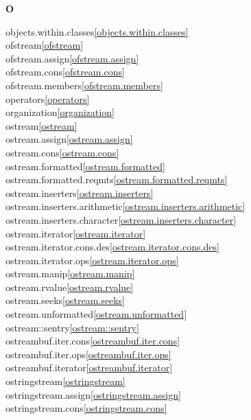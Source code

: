\begin{multicols}{2}
\par \textbf{O}\par
objects.within.classes\quad\ref{objects.within.classes}\\
ofstream\quad\ref{ofstream}\\
ofstream.assign\quad\ref{ofstream.assign}\\
ofstream.cons\quad\ref{ofstream.cons}\\
ofstream.members\quad\ref{ofstream.members}\\
operators\quad\ref{operators}\\
organization\quad\ref{organization}\\
ostream\quad\ref{ostream}\\
ostream.assign\quad\ref{ostream.assign}\\
ostream.cons\quad\ref{ostream.cons}\\
ostream.formatted\quad\ref{ostream.formatted}\\
ostream.formatted.reqmts\quad\ref{ostream.formatted.reqmts}\\
ostream.inserters\quad\ref{ostream.inserters}\\
ostream.inserters.arithmetic\quad\ref{ostream.inserters.arithmetic}\\
ostream.inserters.character\quad\ref{ostream.inserters.character}\\
ostream.iterator\quad\ref{ostream.iterator}\\
ostream.iterator.cons.des\quad\ref{ostream.iterator.cons.des}\\
ostream.iterator.ops\quad\ref{ostream.iterator.ops}\\
ostream.manip\quad\ref{ostream.manip}\\
ostream.rvalue\quad\ref{ostream.rvalue}\\
ostream.seeks\quad\ref{ostream.seeks}\\
ostream.unformatted\quad\ref{ostream.unformatted}\\
ostream::sentry\quad\ref{ostream::sentry}\\
ostreambuf.iter.cons\quad\ref{ostreambuf.iter.cons}\\
ostreambuf.iter.ops\quad\ref{ostreambuf.iter.ops}\\
ostreambuf.iterator\quad\ref{ostreambuf.iterator}\\
ostringstream\quad\ref{ostringstream}\\
ostringstream.assign\quad\ref{ostringstream.assign}\\
ostringstream.cons\quad\ref{ostringstream.cons}\\

\end{multicols}
